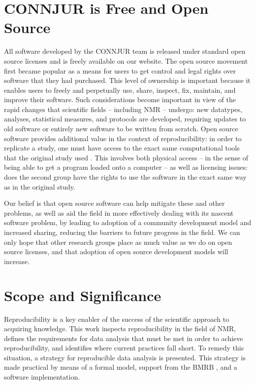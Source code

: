\section{CONNJUR is Free and Open Source}
All software developed by the CONNJUR team is released under standard open 
source licenses and is freely available on our website.  The open source 
movement first became popular as a means for users to get control and legal 
rights over software that they had purchased.  This level of ownership is 
important because it enables users to freely and perpetually use, share, 
inspect, fix, maintain, and improve their software.  Such considerations 
become important in view of the rapid changes that scientific fields -- 
including NMR -- undergo: new datatypes, analyses, statistical measures, 
and protocols are developed, requiring updates to old software or entirely 
new software to be written from scratch.  Open source software provides 
additional value in the context of reproducibility: in order to replicate a
study, one must have access to the exact same computational tools that the 
original study used \cite{ince2012open}.  
This involves both physical access -- in the sense of 
being able to get a program loaded onto a computer -- as well as licensing 
issues: does the second group have the rights to use the software in the 
exact same way as in the original study.

Our belief is that open source software can help mitigate these and other 
problems, as well as aid the field in more effectively dealing with its 
nascent software problem, by leading to adoption of a community development 
model and increased sharing, reducing the barriers to future progress in 
the field.  We can only hope that other research groups place as much value 
as we do on open source licenses, and that adoption of open source development 
models will increase.  


\section{Scope and Significance}
Reproducibility is a key enabler of the success of the scientific approach to 
acquiring knowledge.  This work inspects reproducibility in the field of NMR, 
defines the requirements for data analysis that must be met in order to achieve 
reproducibility, and identifies where current practices fall short.  To remedy 
this situation, a strategy for reproducible data analysis is presented.  This 
strategy is made practical by means of a formal model, support from the BMRB 
\cite{bmrb}, and a software implementation.

